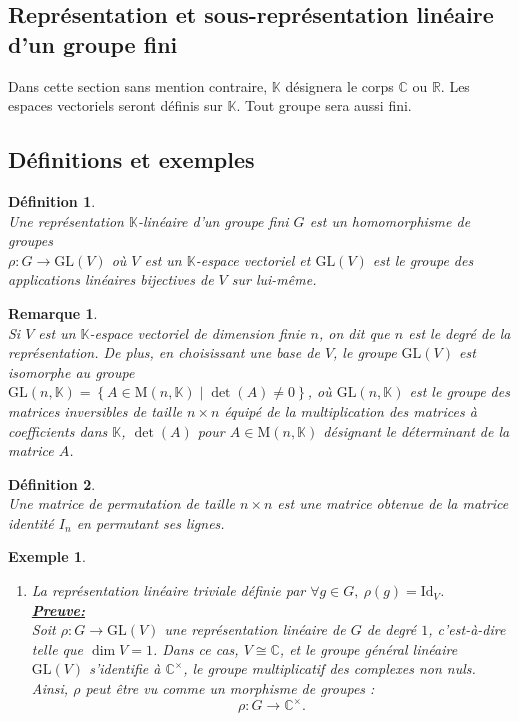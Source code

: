 \documentclass[a4paper, 14pt]{report}
\newtheorem{definition}{Définition}[section]
\newtheorem{remark}{Remarque}[section]
\newtheorem{example}{Exemple}[section]
\begin{document}
\begin{onehalfspace}
{\section{Représentation et sous-représentation linéaire d'un groupe fini}
Dans cette section sans mention contraire, \(\mathbb{K}\) désignera le corps \(\mathbb{C}\) ou \(\mathbb{R}\). Les espaces vectoriels seront définis sur \(\mathbb{K}\). Tout groupe sera aussi fini.

\subsection{Définitions et exemples}
\begin{definition} \cite{serre1971representation} \\
Une représentation \(\mathbb{K}\)-linéaire d'un groupe fini \(G\) est un homomorphisme de groupes \\
\(\rho : G \rightarrow \mathrm{GL}(V)\) où  \(V\) est un \(\mathbb{K}\)-espace vectoriel et \(\mathrm{GL}(V)\) est le groupe des applications linéaires bijectives de \(V\) sur lui-même.
\end{definition}

\begin{remark} \cite{serre1971representation} \\
Si \(V\) est un \(\mathbb{K}\)-espace vectoriel de dimension finie \(n\), on dit que  \(n\) est le degré de la représentation. De plus, en choisissant une base  de \(V\), le groupe \(\mathrm{GL}(V)\) est isomorphe au groupe \\
\(\mathrm{GL}(n, \mathbb{K}) = \left\{ A \in \mathrm{M}(n, \mathbb{K}) \mid \det(A) \neq 0 \right\}\), où \(\mathrm{GL}(n, \mathbb{K})\) est le groupe des matrices inversibles de taille  \(n \times n\) équipé de la multiplication des matrices à coefficients dans \(\mathbb{K}\), $\det(A)$ pour $A \in \mathrm{M}(n, \mathbb{K})$ désignant le déterminant de la matrice $A$.	
\end{remark}

\begin{definition} \cite{cheung2018algebre}\\
Une matrice de permutation de taille \( n \times n \) est une matrice obtenue de la matrice identité \( I_n \) en permutant ses lignes.	
\end{definition}


\begin{example}\
	\begin{enumerate}
		\item La représentation linéaire triviale définie par \(\forall g \in G, \ \rho(g) = \mathrm{Id}_V\).\\
	\textbf{\underline{Preuve:}}  \\		
Soit \( \rho : G \to \mathrm{GL}(V) \) une représentation linéaire de \( G \) de degré \( 1 \), c’est-à-dire telle que \( \dim V = 1 \). 
Dans ce cas, \( V \cong \mathbb{C} \), et le groupe général linéaire \( \mathrm{GL}(V) \) s’identifie à \( \mathbb{C}^\times \), le groupe multiplicatif des complexes non nuls. Ainsi, \( \rho \) peut être vu comme un morphisme de groupes :
		\[
		\rho : G \to \mathbb{C}^\times.
		\]
		

\end{enumerate}
\end{example}}
\end{onehalfspace}
\end{document}
